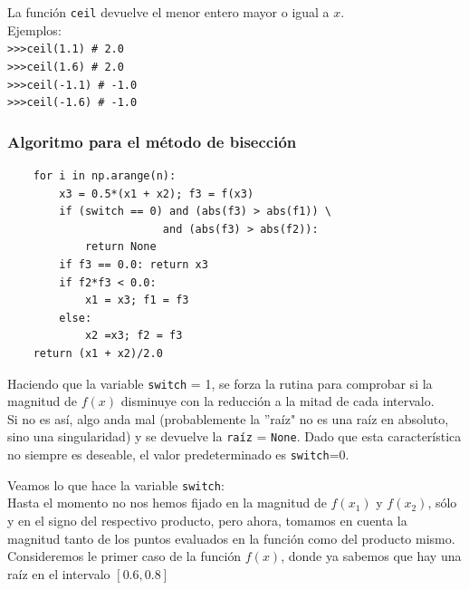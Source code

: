 \documentclass[12pt]{beamer}
\begin{document}
\begin{frame}[fragile]
La funci\'{o}n \texttt{ceil} devuelve el menor entero mayor o igual a $x$.
\\
\medskip
Ejemplos:\\
\medskip
\verb|>>>ceil(1.1) # 2.0| \\
\verb|>>>ceil(1.6) # 2.0| \\
\verb|>>>ceil(-1.1) # -1.0| \\
\verb|>>>ceil(-1.6) # -1.0|
\end{frame}
\begin{frame}[fragile]
\frametitle{Algoritmo para el m\'{e}todo de bisecci\'{o}n}
	\begin{lstlisting}
    for i in np.arange(n):
        x3 = 0.5*(x1 + x2); f3 = f(x3)
        if (switch == 0) and (abs(f3) > abs(f1)) \
                        and (abs(f3) > abs(f2)):
            return None
        if f3 == 0.0: return x3
        if f2*f3 < 0.0:
            x1 = x3; f1 = f3
        else:
            x2 =x3; f2 = f3
    return (x1 + x2)/2.0
	\end{lstlisting}
\end{frame}
\begin{frame}
Haciendo que la variable \texttt{switch} = 1, se forza la rutina para comprobar si la magnitud de $f(x)$ disminuye con la reducci\'{o}n a la mitad de cada intervalo.
\\
\medskip
Si no es as\'{i}, algo anda mal (probablemente la ''ra\'{i}z" no es una ra\'{i}z en absoluto, sino una singularidad) y se devuelve la \texttt{ra\'{i}z} = \texttt{None}. Dado que esta caracter\'{i}stica no siempre es deseable, el valor predeterminado es \texttt{switch}=0.
\end{frame}
\begin{frame}
Veamos lo que hace la variable \texttt{switch}:
\\
\medskip
Hasta el momento no nos hemos fijado en la magnitud de $f(x_{1})$ y $f(x_{2})$, s\'{o}lo y en el signo del respectivo producto, pero ahora, tomamos en cuenta la magnitud tanto de los puntos evaluados en la funci\'{o}n como del producto mismo.
\\
\medskip
Consideremos le primer caso de la funci\'{o}n $f(x)$, donde ya sabemos que hay una ra\'{i}z en el intervalo $[0.6,0.8]$
\end{frame}
\end{document}
